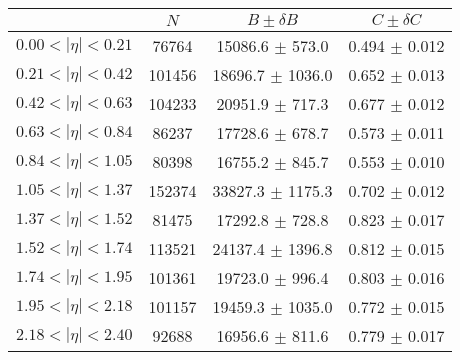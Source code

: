 \begin{tabular}{lccc}
\hline
    &   $N$   & $B \pm \delta B$  &  $C \pm \delta C$ \\
\hline
$0.00 < |\eta| <0.21$          & 76764      & 15086.6    $\pm$ 573.0 & 0.494      $\pm$ 0.012 \\
$0.21 < |\eta| <0.42$          & 101456     & 18696.7    $\pm$ 1036.0 & 0.652      $\pm$ 0.013 \\
$0.42 < |\eta| <0.63$          & 104233     & 20951.9    $\pm$ 717.3 & 0.677      $\pm$ 0.012 \\
$0.63 < |\eta| <0.84$          & 86237      & 17728.6    $\pm$ 678.7 & 0.573      $\pm$ 0.011 \\
$0.84 < |\eta| <1.05$          & 80398      & 16755.2    $\pm$ 845.7 & 0.553      $\pm$ 0.010 \\
$1.05 < |\eta| <1.37$          & 152374     & 33827.3    $\pm$ 1175.3 & 0.702      $\pm$ 0.012 \\
$1.37 < |\eta| <1.52$          & 81475      & 17292.8    $\pm$ 728.8 & 0.823      $\pm$ 0.017 \\
$1.52 < |\eta| <1.74$          & 113521     & 24137.4    $\pm$ 1396.8 & 0.812      $\pm$ 0.015 \\
$1.74 < |\eta| <1.95$          & 101361     & 19723.0    $\pm$ 996.4 & 0.803      $\pm$ 0.016 \\
$1.95 < |\eta| <2.18$          & 101157     & 19459.3    $\pm$ 1035.0 & 0.772      $\pm$ 0.015 \\
$2.18 < |\eta| <2.40$          & 92688      & 16956.6    $\pm$ 811.6 & 0.779      $\pm$ 0.017 \\
\hline
\end{tabular}
